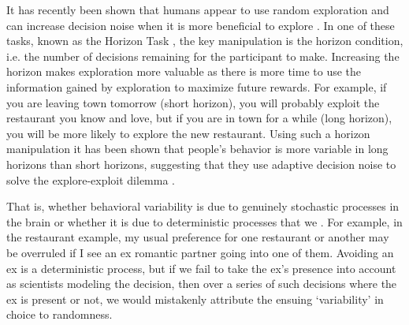 \documentclass[12pt]{article}
\begin{document}
	It has recently been shown that humans appear to use random exploration and can increase  decision noise when it is more beneficial to explore \citep{Gershman2018, wilson2014} . In one of these tasks, known as the Horizon Task \citep{wilson2014}, the key manipulation is the horizon condition, i.e. the number of decisions remaining for the participant to make. Increasing the horizon makes exploration more valuable as there is more time to use the information gained by exploration to maximize future rewards. For example, if you are leaving town tomorrow (short horizon), you will probably exploit the restaurant you know and love, but if you are in town for a while (long horizon), you will be more likely to explore the new restaurant. Using such a horizon manipulation it has been shown that people's behavior is more variable in long horizons than short horizons, suggesting that they use adaptive decision noise to solve the explore-exploit dilemma \citep{wilson2014}. 
	
	 That is, whether behavioral variability is due to genuinely stochastic processes in the brain or whether it is due to deterministic processes that we .  For example, in the restaurant example, my usual preference for one restaurant or another may be overruled if I see an ex romantic partner going into one of them. Avoiding an ex is a deterministic process, but if we fail to take the ex's presence into account as scientists modeling the decision, then over a series of such decisions where the ex is present or not, we would mistakenly attribute the ensuing `variability' in choice to randomness.
	
	

	
\end{document}

